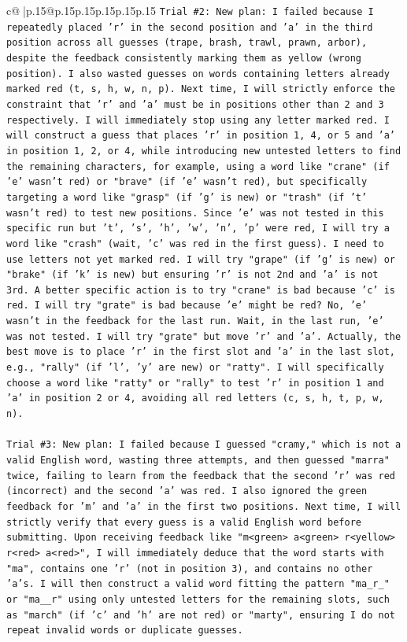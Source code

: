 \documentclass{article}
\begin{document}
{\begin{supertabular}{c@{$\;$}|p{.15\linewidth}@{}p{.15\linewidth}p{.15\linewidth}p{.15\linewidth}p{.15\linewidth}p{.15\linewidth}}
{{{\texttt{Trial \#2: New plan: I failed because I repeatedly placed 'r' in the second position and 'a' in the third position across all guesses (trape, brash, trawl, prawn, arbor), despite the feedback consistently marking them as yellow (wrong position). I also wasted guesses on words containing letters already marked red (t, s, h, w, n, p). Next time, I will strictly enforce the constraint that 'r' and 'a' must be in positions other than 2 and 3 respectively. I will immediately stop using any letter marked red. I will construct a guess that places 'r' in position 1, 4, or 5 and 'a' in position 1, 2, or 4, while introducing new untested letters to find the remaining characters, for example, using a word like "crane" (if 'e' wasn't red) or "brave" (if 'e' wasn't red), but specifically targeting a word like "grasp" (if 'g' is new) or "trash" (if 't' wasn't red) to test new positions. Since 'e' was not tested in this specific run but 't', 's', 'h', 'w', 'n', 'p' were red, I will try a word like "crash" (wait, 'c' was red in the first guess). I need to use letters not yet marked red. I will try "grape" (if 'g' is new) or "brake" (if 'k' is new) but ensuring 'r' is not 2nd and 'a' is not 3rd. A better specific action is to try "crane" is bad because 'c' is red. I will try "grate" is bad because 'e' might be red? No, 'e' wasn't in the feedback for the last run. Wait, in the last run, 'e' was not tested. I will try "grate" but move 'r' and 'a'. Actually, the best move is to place 'r' in the first slot and 'a' in the last slot, e.g., "rally" (if 'l', 'y' are new) or "ratty". I will specifically choose a word like "ratty" or "rally" to test 'r' in position 1 and 'a' in position 2 or 4, avoiding all red letters (c, s, h, t, p, w, n).} \\
\\ 
\texttt{Trial \#3: New plan: I failed because I guessed "cramy," which is not a valid English word, wasting three attempts, and then guessed "marra" twice, failing to learn from the feedback that the second 'r' was red (incorrect) and the second 'a' was red. I also ignored the green feedback for 'm' and 'a' in the first two positions. Next time, I will strictly verify that every guess is a valid English word before submitting. Upon receiving feedback like "m<green> a<green> r<yellow> r<red> a<red>", I will immediately deduce that the word starts with "ma", contains one 'r' (not in position 3), and contains no other 'a's. I will then construct a valid word fitting the pattern "ma\_r\_" or "ma\_\_r" using only untested letters for the remaining slots, such as "march" (if 'c' and 'h' are not red) or "marty", ensuring I do not repeat invalid words or duplicate guesses.} \\
}}}
\end{supertabular}}
\end{document}
